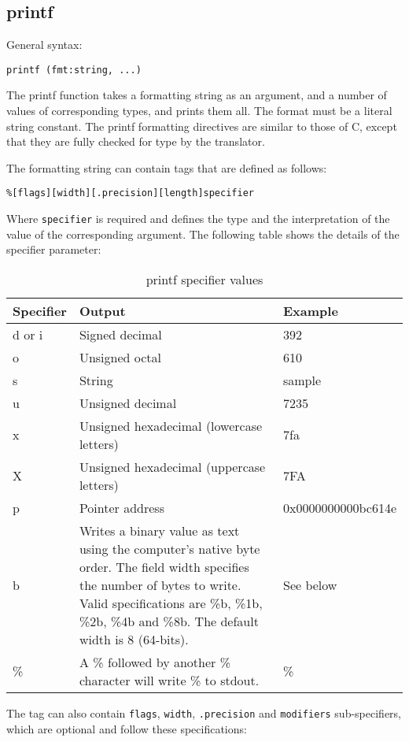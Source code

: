 \documentclass[twoside,english]{article}
\providecommand{\tabularnewline}{\\}
\newenvironment{vindent}
{\begin{list}{}{\setlength{\listparindent}{6pt}}
\item[]}
{\end{list}}
\begin{document}
\subsection{printf}
General syntax:

\begin{vindent}
\begin{verbatim}
printf (fmt:string, ...)
\end{verbatim}
\end{vindent}
The printf function takes a formatting string as an argument, and a number
of values of corresponding types, and prints them all. The format must be a
literal string constant. The printf formatting directives are similar to those
of C, except that they are fully checked for type by the translator.

The formatting string can contain tags that are defined as follows:

\begin{vindent}
\begin{verbatim}
%[flags][width][.precision][length]specifier
\end{verbatim}
\end{vindent}
Where \texttt{specifier} is required and defines the type and the interpretation
of the value of the corresponding argument. The following table shows the
details of the specifier parameter:

\begin{table}[H]
\caption{printf specifier values}
\begin{tabular}{|>{\raggedright}p{1in}|>{\raggedright}p{3.5in}|>{\raggedright}p{1.25in}|}
\hline
\textbf{Specifier}&
\textbf{Output}&
\textbf{Example}\tabularnewline
\hline
\hline
d or i&
Signed decimal&
392\tabularnewline
\hline
o&
Unsigned octal&
610\tabularnewline
\hline
s&
String&
sample\tabularnewline
\hline
u&
Unsigned decimal&
7235\tabularnewline
\hline
x&
Unsigned hexadecimal (lowercase letters)&
7fa\tabularnewline
\hline
X&
Unsigned hexadecimal (uppercase letters)&
7FA\tabularnewline
\hline
p&
Pointer address&
0x0000000000bc614e\tabularnewline
\hline
b&
Writes a binary value as text using the computer's native byte order.
The field width specifies the number of bytes
to write. Valid specifications are \%b, \%1b, \%2b, \%4b and \%8b. The default
width is 8 (64-bits).&
See below\tabularnewline
\hline
\%&
A \% followed by another \% character will write \% to stdout.&
\%\tabularnewline
\hline
\end{tabular}
\end{table}
The tag can also contain \texttt{flags}, \texttt{width}, \texttt{.precision}
and \texttt{modifiers} sub-specifiers, which are optional and follow these
specifications:
\end{document}
